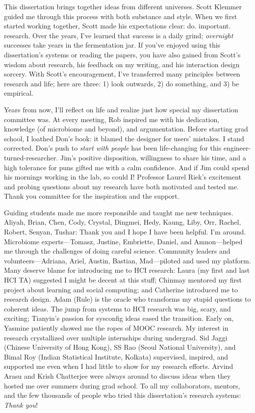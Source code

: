 \begin{frontmatter}
\begin{acknowledgements}
This dissertation brings together ideas from different universes. Scott Klemmer guided me through this process with both substance and style. When we first started working together, Scott made his expectations clear: do. important. research. Over the years, I’ve learned that success is a daily grind; \textit{overnight} successes take years in the fermentation jar. If you’ve enjoyed using this dissertation’s systems or reading the papers, you have also gained from Scott’s wisdom about research, his feedback on my writing, and his interaction design sorcery. With Scott’s encouragement, I’ve transferred many principles between research and life; here are three: 1) look outwards, 2) do something, and 3) be empirical.

Years from now, I'll reflect on life and realize just how special my dissertation committee was. At every meeting, Rob inspired me with his dedication, knowledge (of microbiome and beyond), and argumentation. Before starting grad school, I loathed Don’s book: it blamed the designer for users’ mistakes. I stand corrected. Don’s push to \textit{start with people} has been life-changing for this engineer-turned-researcher. Jim’s positive disposition, willingness to share his time, and a high tolerance for puns gifted me with a calm confidence. And if Jim could spend his mornings working in the lab, so could I! Professor Laurel Riek’s excitement and probing questions about my research have both motivated and tested me. Thank you committee for the inspiration and the support. 

Guiding students made me more responsible and taught me new techniques. Aliyah, Brian, Chen, Cody, Crystal, Dingmei, Hedy, Kaung, Liby, Orr, Rachel, Robert, Senyan, Tushar: Thank you and I hope I have been helpful. I’m around. Microbiome experts---Tomasz, Justine, Embriette, Daniel, and Amnon---helped me through the challenges of doing careful science. Community leaders and volunteers---Adriana, Ariel, Austin, Bastian, Mad---piloted and used my platform. Many deserve blame for introducing me to HCI research: Laura (my first and last HCI TA) suggested I might be decent at this stuff; Chinmay mentored my first project about learning and social computing; and Catherine introduced me to research design. Adam (Rule) is the oracle who transforms my stupid questions to coherent ideas. The jump from systems to HCI research was big, scary, and exciting; Tianyin’s passion for sysconfig ideas eased the transition. Early on, Yasmine patiently showed me the ropes of MOOC research. My interest in research crystallized over multiple internships during undergrad. Sid Jaggi (Chinese University of Hong Kong), SS Rao (Seoul National University), and Bimal Roy (Indian Statistical Institute, Kolkata) supervised, inspired, and supported me even when I had little to show for my research efforts. Arvind Arasu and Krish Chatterjee were always around to discuss ideas when they hosted me over summers during grad school. To all my collaborators, mentors, and the few thousands of people who tried this dissertation's research systems: \textit{Thank you}! 


\end{acknowledgements}
\end{frontmatter}

